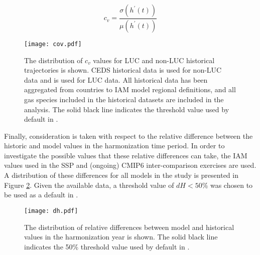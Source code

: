 \begin{equation}\label{eqs:cov}
% 
% 
    c_v =  \frac{\sigma(h^{\prime}(t))}{\mu(h^{\prime}(t))}
\end{equation}


\begin{figure}
  \begin{center}
    \texttt{[image: cov.pdf]}
    \caption[]{
      \label{fig:cov}
      The distribution of $c_v$ values for LUC and non-LUC historical
      trajectories is shown. CEDS historical data \cite{hoesly_historical_2017}
      is used for non-LUC data and \cite{van_marle_historic_2017} is used for
      LUC data. All historical data has been aggregated from countries to IAM
      model regional definitions, and all gas species included in the historical
      datasets are included in the analysis. The solid black line indicates the
      threshold value used by default in .  }
  \end{center}
\end{figure}

Finally, consideration is taken with respect to the relative difference between
the historic and model values in the harmonization time period. In order to
investigate the possible values that these relative differences can take, the
IAM values used in the SSP and (ongoing) CMIP6 inter-comparison
exercises are used. A distribution of these differences for all models in the
study is presented in Figure \ref{fig:dh}. Given the available data, a threshold
value of $dH < 50$\% was chosen to be used as a default in .
% 
% 

\begin{figure}
  \begin{center}
    \texttt{[image: dh.pdf]}
    \caption[]{
      \label{fig:dh}
      The distribution of relative differences between model and historical
      values in the harmonization year is shown. The solid black line indicates
      the 50\% threshold value used by default in .  
% 
% 
    }
  \end{center}
\end{figure}

